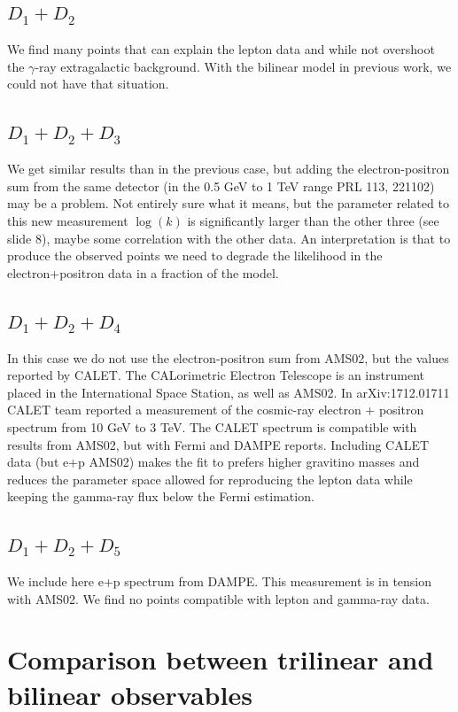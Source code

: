\documentclass[a4paper,11pt]{article}
\begin{document}
\subsection{$D_1 + D_2$}

We find many points that can explain the lepton data and while not overshoot the $\gamma$-ray extragalactic background. With the bilinear model in previous work, we could not have that situation.

\subsection{$D_1 + D_2 + D_3$}

We get similar results than in the previous case, but adding the electron-positron sum from the same detector (in the 0.5 GeV to 1 TeV range PRL 113, 221102) may be a problem. Not entirely sure what it means, but the parameter related to this new measurement $\log(k)$ is significantly larger than the other three (see slide 8), maybe some correlation with the other data. An interpretation is that to produce the observed points we need to degrade the likelihood in the electron+positron data in a fraction of the model.

\subsection{$D_1 + D_2 + D_4$}

In this case we do not use the electron-positron sum from AMS02, but the values reported by CALET. The CALorimetric Electron Telescope is an instrument placed in the International Space Station, as well as AMS02. In arXiv:1712.01711 CALET team reported a measurement of the cosmic-ray electron + positron spectrum from 10 GeV to 3 TeV. The CALET spectrum is compatible with results from AMS02, but with Fermi and DAMPE reports. Including CALET data (but e+p AMS02) makes the fit to prefers higher gravitino masses and reduces the parameter space allowed for reproducing the lepton data while keeping the gamma-ray flux below the Fermi estimation.

\subsection{$D_1 + D_2 + D_5$}
We include here e+p spectrum from DAMPE. This measurement is in tension with AMS02. We find no points compatible with lepton and gamma-ray data.

\section{Comparison between trilinear and bilinear observables}
\end{document}
